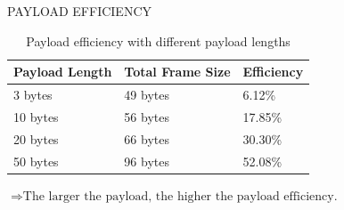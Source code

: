 \begin{frame}{PAYLOAD EFFICIENCY}
	\begin{table}[h]
	\centering
	\small
	\caption{Payload efficiency with different payload lengths}
	\label{tab:efficiency}
	\begin{tabular}{|p{4cm}|p{5cm}|p{3cm}|}
	\hline
	Payload Length & Total Frame Size & Efficiency \\
	\hline
	3 bytes   & 49 bytes  & 6.12\%  \\
	10 bytes  & 56 bytes & 17.85\% \\
	20 bytes  & 66 bytes & 30.30\% \\
	50 bytes  & 96 bytes & 52.08\% \\
	\hline
	\end{tabular}
	\end{table}
	$\Rightarrow \text{The larger the payload, the higher the payload efficiency.}$
\end{frame}